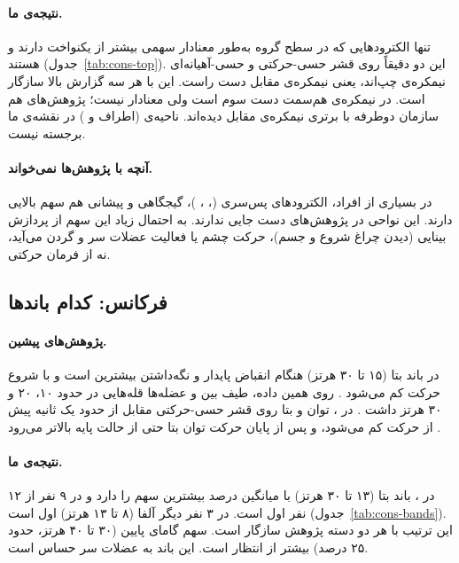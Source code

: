 \paragraph{نتیجه‌ی ما.} تنها الکترودهایی که در سطح گروه به‌طور معنادار سهمی بیشتر از یکنواخت دارند  و  هستند (جدول~\ref{tab:cons-top}). این دو دقیقاً روی قشر حسی-حرکتی و حسی-آهیانه‌ای نیمکره‌ی چپ‌اند، یعنی نیمکره‌ی مقابل دست راست. این با هر سه گزارش بالا سازگار است.  در نیمکره‌ی هم‌سمت دست سوم است ولی معنادار نیست؛ پژوهش‌های  هم سازمان دوطرفه با برتری نیمکره‌ی مقابل دیده‌اند. ناحیه‌ی  (اطراف  و ) در نقشه‌ی ما برجسته نیست.

\paragraph{آنچه با پژوهش‌ها نمی‌خواند.} در بسیاری از افراد، الکترودهای پس‌سری (، ، )، گیجگاهی و پیشانی هم سهم بالایی دارند. این نواحی در پژوهش‌های  دست جایی ندارند. به احتمال زیاد این سهم از پردازش بینایی (دیدن چراغ شروع و جسم)، حرکت چشم یا فعالیت عضلات سر و گردن می‌آید، نه از فرمان حرکتی.

\subsection{فرکانس: کدام باندها}

\paragraph{پژوهش‌های پیشین.}  در باند بتا (۱۵ تا ۳۰ هرتز) هنگام انقباض پایدار و نگه‌داشتن بیشترین است و با شروع حرکت کم می‌شود \cite{kilner2000}. روی همین داده، طیف  بین  و عضله‌ها قله‌هایی در حدود ۱۰، ۲۰ و ۳۰ هرتز داشت \cite{cisotto2018}. در ، توان  و بتا روی قشر حسی-حرکتی مقابل از حدود یک ثانیه پیش از حرکت کم می‌شود، و پس از پایان حرکت توان بتا حتی از حالت پایه بالاتر می‌رود \cite{pfurtscheller1999}.

\paragraph{نتیجه‌ی ما.} در ، باند بتا (۱۳ تا ۳۰ هرتز) با میانگین  درصد بیشترین سهم را دارد و در ۹ نفر از ۱۲ نفر اول است. در ۳ نفر دیگر آلفا (۸ تا ۱۳ هرتز) اول است (جدول~\ref{tab:cons-bands}). این ترتیب با هر دو دسته پژوهش سازگار است. سهم گامای پایین (۳۰ تا ۴۰ هرتز، حدود ۲۵ درصد) بیشتر از انتظار است. این باند به  عضلات سر حساس است.

